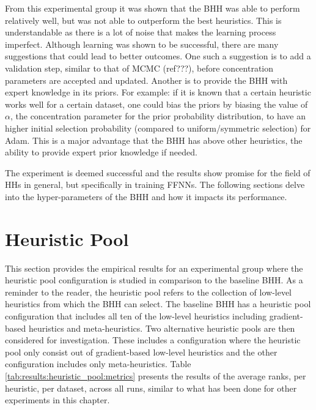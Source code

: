 From this experimental group it was shown that the \Ac{BHH} was able to perform relatively well, but was not able to outperform the best heuristics. This is understandable as there is a lot of noise that makes the learning process imperfect. Although learning was shown to be successful, there are many suggestions that could lead to better outcomes. One such a suggestion is to add a validation step, similar to that of \ac{MCMC} (ref???), before concentration parameters are accepted and updated. Another is to provide the \Ac{BHH} with expert knowledge in its priors. For example: if it is known that a certain heuristic works well for a certain dataset, one could bias the priors by biasing the value of  $\alpha$, the concentration parameter for the prior probability distribution, to have an higher initial selection probability (compared to uniform/symmetric selection) for \Ac{Adam}. This is a major advantage that the \Ac{BHH} has above other heuristics, the ability to provide expert prior knowledge if needed. 

The experiment is deemed successful and the results show promise for the field of \Acp{HH} in general, but specifically in training \Acp{FFNN}. The following sections delve into the hyper-parameters of the \Ac{BHH} and how it impacts its performance.


\section{Heuristic Pool}
\label{sec:results:heuristic_pool}

This section provides the empirical results for an experimental group where the heuristic pool configuration is studied in comparison to the baseline \Ac{BHH}. As a reminder to the reader, the heuristic pool refers to the collection of low-level heuristics from which the \Ac{BHH} can select. The baseline \Ac{BHH} has a heuristic pool configuration that includes all ten of the low-level heuristics including gradient-based heuristics and meta-heuristics. Two alternative heuristic pools are then considered for investigation. These includes a configuration where the heuristic pool only consist out of gradient-based low-level heuristics and the other configuration includes only meta-heuristics. Table \ref{tab:results:heuristic_pool:metrics} presents the results of the average ranks, per heuristic, per dataset, across all runs, similar to what has been done for other experiments in this chapter.

